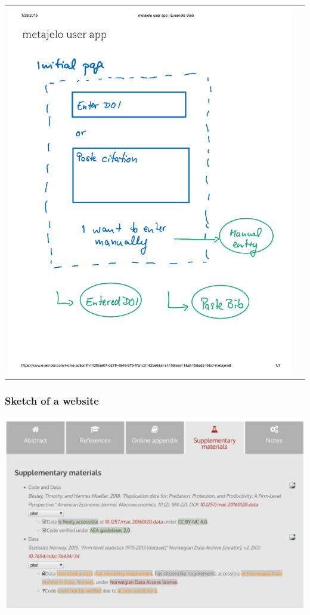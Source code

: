 \begin{frame}
\begin{tabular}{cc}
\includegraphics[page={7},height=0.7\paperheight]{images/metajelo-user-app-Evernote.pdf}
\end{tabular}
\end{frame}

\begin{frame}
\frametitle{Sketch of a website}
\includegraphics[height=0.7\paperheight]{images/aeaweb-demo1.png}
\end{frame}

